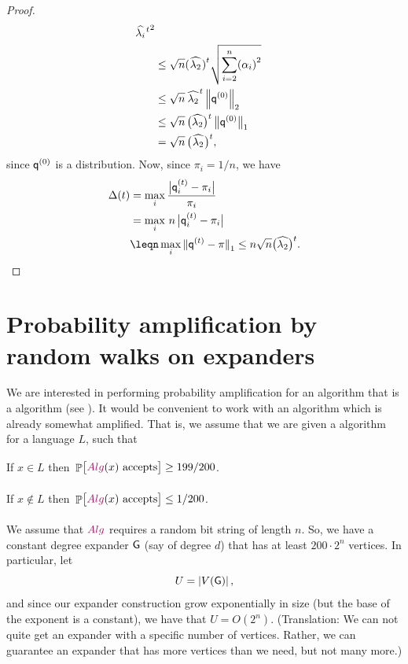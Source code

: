 \begin{proof}
\begin{align*}
{{{        \smash{\TEV{i}} \ts }^t}^2}%
      \\&%
      \leq%
      \sqrt{n} \pth[]{\ts\smash{\TEV{2}}\ts}^t \sqrt{\sum_{i=2}^n \pth{
      \alpha_i}^2}
      \\&\leq%
      \sqrt{n}\, {\ts\TEV{2}\ts}^t \norm{\DstrbV{0}}_2%
      \\&\leq%
      \sqrt{n}\, \pth{\bigl.\smash{\TEV{2}}}^t
      \norm{\bigl.\smash{\DstrbV{0}}}_1%
      \\&=%
      \sqrt{n}\, \pth{\ts\bigl.\smash{\TEV{2}}\ts}^t,
    \end{align*}
    since $\mathbf{\mathsf{q}}^{(0)}$ is a distribution. Now, since $\pi_i = 1/n$, we
    have
    \begin{align*}
        \Delta(t)%
        &=%
        \max_i \frac{\bigl| {\DstrbE{t}{i} -\pi_i} \bigr| }{\pi_i}%
      \\&=%
        \max_i \,n \,{\bigl|{\DstrbE{t}{i} - \pi_i}\bigr|}%
      \\&\leq%
        n \max_i \norm{\smash{\DstrbV{t}} - \pi}_1 \leq n
        \sqrt{n} \pth{\bigl.\smash{\TEV{2}}}^t.
    \end{align*}
\end{proof}


\section{Probability amplification by random walks %
   on expanders}

We are interested in performing probability amplification for an
algorithm that is a  algorithm (see ).
It would be convenient to work with an algorithm which is already
somewhat amplified. That is, we assume that we are given a
 algorithm \Alg for a language $L$, such that 

\smallskip

\begin{compactenumA}
    \item If $x \in L$ then $\Big.\Prob{\bigl. \Alg(x) \text{
          accepts}} \geq 199/200$.
    
    \smallskip

    \item If $x \notin L$ then
    $\Big. \Prob{\bigl.\Alg(x) \text{ accepts}} \leq 1/200$.
\end{compactenumA}

\medskip

We assume that $\Alg$ requires a random bit string of length $n$. So,
we have a constant degree expander $\mathsf{G}$ (say of degree $d$) that
has at least $200 \cdot 2^n$ vertices. In particular, let 
\begin{equation*}
    U = \left| {V(\mathsf{G})} \right|,
\end{equation*}
and since our expander construction grow exponentially in size (but
the base of the exponent is a constant), we have that $U =
O(2^n)$. (Translation: We can not quite get an expander with a
specific number of vertices. Rather, we can guarantee an expander that
has more vertices than we need, but not many more.)

